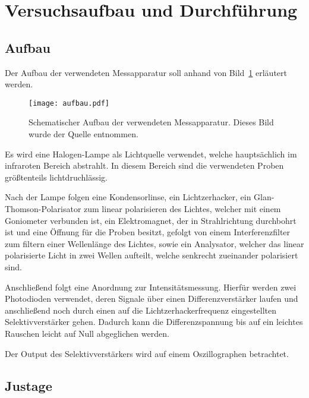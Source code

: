 
\section{Versuchsaufbau und Durchführung}
\subsection{Aufbau}
%

Der Aufbau der verwendeten Messapparatur soll anhand von 
Bild~\ref{fig:aufbau} erläutert werden.

\begin{figure}
\centering
\texttt{[image: aufbau.pdf]}
\caption{Schematischer Aufbau der verwendeten Messapparatur. 
Dieses Bild wurde der Quelle \cite{v046} entnommen.}
\label{fig:aufbau}
\end{figure}

Es wird eine Halogen-Lampe als Lichtquelle verwendet, welche 
hauptsächlich im infraroten Bereich abstrahlt. In diesem Bereich 
sind die verwendeten Proben größtenteils lichtdruchlässig.

Nach der Lampe folgen eine Kondensorlinse, ein Lichtzerhacker, 
ein Glan-Thomson-Polarisator zum linear polarisieren des Lichtes, 
welcher mit einem Goniometer verbunden ist, ein Elektromagnet, 
der in Strahlrichtung durchbohrt ist und eine Öffnung für die Proben 
besitzt, gefolgt von einem Interferenzfilter zum filtern einer 
Wellenlänge des Lichtes, sowie ein Analysator, welcher das 
linear polarisierte Licht in zwei Wellen aufteilt, welche 
senkrecht zueinander polarisiert sind.

Anschließend folgt eine Anordnung zur Intensitätsmessung. 
Hierfür werden zwei Photodioden verwendet, deren Signale 
über einen Differenzverstärker laufen und anschließend 
noch durch einen auf die Lichtzerhackerfrequenz eingestellten 
Selektivverstärker gehen. Dadurch kann die Differenzspannung 
bis auf ein leichtes Rauschen leicht auf Null abgeglichen werden.

Der Output des Selektivverstärkers wird auf einem Oszillographen betrachtet.

%
\subsection{Justage}
%

